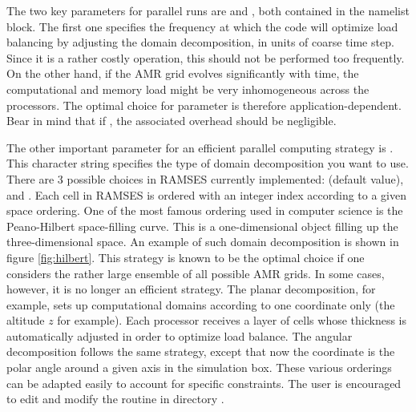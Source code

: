 The two key parameters for parallel runs are  and
, both contained in the 
namelist block. The first one specifies the frequency at which the code
will optimize load balancing by adjusting the domain decomposition, in
units of coarse time step. Since it is a rather costly operation, this
should not be performed too frequently. On the other hand, if the AMR
grid evolves significantly with time, the computational and memory load
might be very inhomogeneous across the processors. The optimal choice
for parameter  is therefore application-dependent. Bear
in mind that if , the associated overhead should be
negligible.

The other important parameter for an efficient parallel computing
strategy is . This character string specifies the type
of domain decomposition you want to use. There are 3 possible choices in
RAMSES currently implemented:  (default value),
 and . Each cell in RAMSES is ordered with
an integer index according to a given space ordering. One of the most
famous ordering used in computer science is the Peano-Hilbert
space-filling curve. This is a one-dimensional object filling up the
three-dimensional space. An example of such domain decomposition is
shown in figure \ref{fig:hilbert}. This strategy is known to be the
optimal choice if one considers the rather large ensemble of all
possible AMR grids. In some cases, however, it is no longer an
efficient strategy. The planar decomposition, for example, sets up
computational domains according to one coordinate only (the altitude $z$
for example). Each processor receives a layer of cells whose thickness
is automatically adjusted in order to optimize load balance. The angular
decomposition follows the same strategy, except that now the coordinate
is the polar angle around a given axis in the simulation box. These
various orderings can be adapted easily to account for specific
constraints. The user is encouraged to edit and modify the routine
 in directory .

